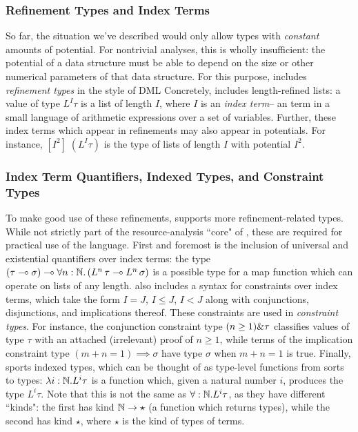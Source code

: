 \subsubsection{Refinement Types and Index Terms}
\label{sec:lambdaamor-overview-refty}
So far, the situation we've described would only allow types with \textit{constant} amounts of potential. For nontrivial analyses, this is wholly insufficient: the potential of a data structure must be able to depend on the size or other numerical parameters of that data structure. For this purpose, \lambdaamor includes \textit{refinement types} in the style of DML Concretely, \lambdaamor includes length-refined lists: a value of type $L^I \tau$ is a list of length $I$, where $I$ is an \textit{index term}-- an term in a small language of arithmetic expressions over a set of variables. Further, these index terms which appear in refinements may also appear in potentials. For instance, $\left[I^2\right] \; (L^I \tau)$ is the type of lists of length $I$ with potential $I^2$. 

\subsubsection{Index Term Quantifiers, Indexed Types, and Constraint Types}
To make good use of these refinements, \lambdaamor supports more refinement-related types. While not strictly part of the resource-analysis ``core" of \lambdaamor, these are required for practical use of the language. First and foremost is the inclusion of universal and existential quantifiers over index terms: the type $(\tau \multimap \sigma) \multimap \forall n : \mathbb{N}. \left(L^n \,\tau \multimap L^{n} \, \sigma\right)$ is a possible type for a map function which can operate on lists of any length. \lambdaamor also includes a syntax for constraints over index terms, which take the form $I = J$, $I \leq J$, $I < J$ along with conjunctions, disjunctions, and implications thereof. These constraints are used in \textit{constraint types}. For instance, the conjunction constraint type $(n \geq 1) \& \tau$ classifies values of type $\tau$ with an attached (irrelevant) proof of $n \geq 1$, while terms of the implication constraint type $(m + n = 1) \implies \sigma$ have type $\sigma$ when $m + n = 1$ is true. Finally, \lambdaamor sports indexed types, which can be thought of as type-level functions from sorts to types: $\lambda i : \mathbb{N}. L^i \tau$ is a function which, given a natural number $i$, produces the type $L^i \tau$. Note that this is not the same as $\forall : \mathbb{N}. L^i \tau$, as they have different ``kinds": the first has kind $\mathbb{N} \to \star$ (a function which returns types), while the second has kind $\star$, where $\star$ is the kind of types of terms.

